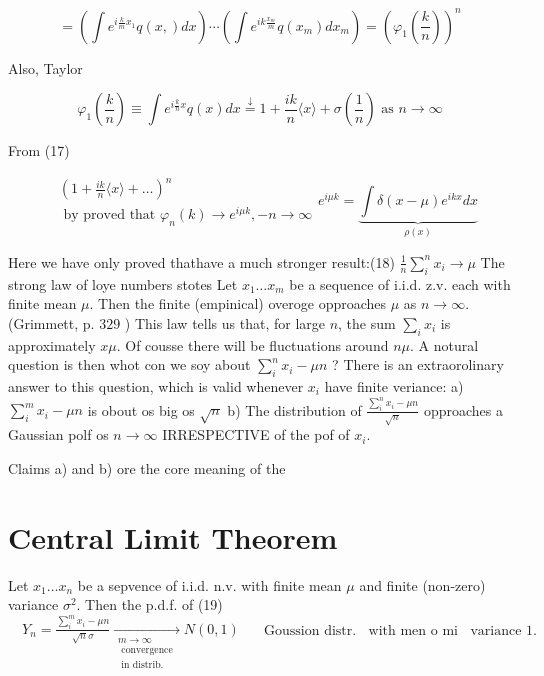 $$ 
=\left(\int e^{i \frac{k}{m} x_{1}} q(x,) d x\right) \cdots\left(\int e^{i k \frac{x_{m}}{m}} q\left(x_{m}\right) d x_{m}\right)=\left(\varphi_{1}\left(\frac{k}{n}\right)\right)^{n}
$$ 

Also, Taylor

$$ 
\varphi_{1}\left(\frac{k}{n}\right) \equiv \int e^{i \frac{k}{n} x} q(x) d x \stackrel{\downarrow}{=} 1+\frac{i k}{n}\langle x\rangle+\sigma\left(\frac{1}{n}\right) \text { as } n \rightarrow \infty
$$ 

From (17)

$$ 
\begin{aligned}
& \left(1+\frac{i k}{n}\langle x\rangle+\ldots\right)^{n} \\& \text { by proved that } \varphi_{n}(k) \rightarrow e^{i \mu k},-n \rightarrow \infty
\end{aligned} e^{i \mu k}=\underbrace{\int \delta(x-\mu) e^{i k x} d x}_{\rho(x)}
$$ 

Here we have only proved that\nWe have a much stronger result:\n(18) $\frac{1}{n} \sum_{i}^{n} x_{i} \rightarrow \mu$ The strong law of loye numbers stotes Let $x_{1} \ldots x_{m}$ be a sequence of i.i.d. z.v. each with finite mean $\mu$. Then the finite (empinical) overoge opproaches $\mu$ as $n \rightarrow \infty$. (Grimmett, p. ${329}$ )
This law tells us that, for large $n$, the sum $\sum_{i} x_{i}$ is approximately $x \mu$. Of cousse there will be fluctuations around $n \mu$. A notural question is then whot con we soy about $\sum_{i}^{n} x_{i}-\mu n$ ?
There is an extraorolinary answer to this question, which is valid whenever $x_{i}$ have finite veriance:
a) $\sum_{i}^{m} x_{i}-\mu n$ is obout os big os $\sqrt{n}$
b) The distribution of $\frac{\sum_{i}^{n} x_{i}-\mu n}{\sqrt{n}}$ opproaches a Gaussian polf os $n \rightarrow \infty$ IRRESPECTIVE of the pof of $x_{i}$.

Claims a) and b) ore the core meaning of the

\section*{Central Limit Theorem}
Let $x_{1} \ldots x_{n}$ be a sepvence of i.i.d. n.v. with finite mean $\mu$ and finite (non-zero) variance $\sigma^{2}$. Then the p.d.f. of
(19) $\quad Y_{n}=\frac{\sum_{i}^{m} x_{i}-\mu n}{\sqrt{n} \sigma} \xrightarrow[\begin{array}{c}
 m \rightarrow \infty \\ \text { convergence } \\ \text { in distrib. } \\
\end{array}]{ } N(0,1) \quad \begin{gathered} \text { Goussion distr. } \ \text { with men o mi } \ \text { variance } 1 . 
\end{gathered}$

